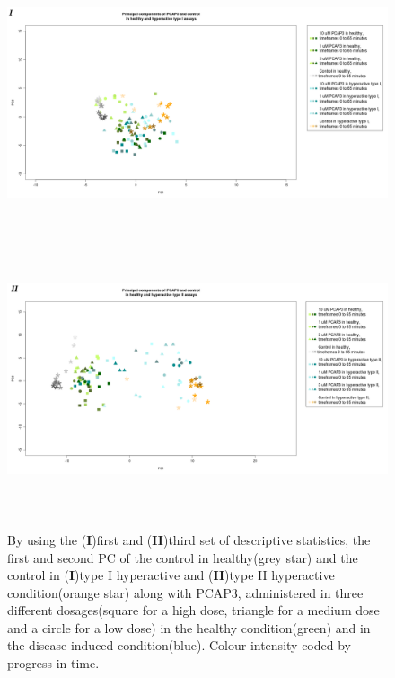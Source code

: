 \documentclass[a4paper,12pt]{article}
\begin{document}
\begin{figure}[h!]
\begin{center}
\includegraphics[width=16cm,height=8cm]{PCAP814_Control_DarkApoHigh.png}
\includegraphics[width=16cm,height=8cm]{PCAP814_Control_DarkPTZ_stratified.png}
\caption{By using the (\textbf{I})first and (\textbf{II})third set of descriptive statistics, the first and second PC of the control in healthy(grey star) and the control in (\textbf{I})type I hyperactive and (\textbf{II})type II hyperactive condition(orange star) along with PCAP3, administered in three different dosages(square for a high dose, triangle for a medium dose and a circle for a low dose) in the healthy condition(green) and in the disease induced condition(blue). Colour intensity coded by progress in time.}
\end{center}
\end{figure}
\end{document}
